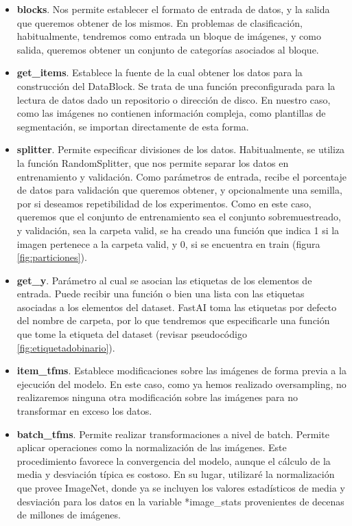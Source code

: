 \begin{itemize}
	\item \textbf{blocks}. Nos permite establecer el formato de entrada de datos, y la salida que queremos obtener de los mismos. En problemas de clasificación, habitualmente, tendremos como entrada un bloque de imágenes, y como salida, queremos obtener un conjunto de categorías asociados al bloque.
	\item \textbf{get\_items}. Establece la fuente de la cual obtener los datos para la construcción del DataBlock. Se trata de una función preconfigurada para la lectura de datos dado un repositorio o dirección de disco. En nuestro caso, como las imágenes no contienen información compleja, como plantillas de segmentación, se importan directamente de esta forma.
	\item \textbf{splitter}. Permite especificar divisiones de los datos. Habitualmente, se utiliza la función RandomSplitter, que nos permite separar los datos en entrenamiento y validación. Como parámetros de entrada, recibe el porcentaje de datos para validación que queremos obtener, y opcionalmente una semilla, por si deseamos repetibilidad de los experimentos. Como en este caso, queremos que el conjunto de entrenamiento sea el conjunto sobremuestreado, y validación, sea la carpeta valid, se ha creado una función que indica 1 si la imagen pertenece a la carpeta valid, y 0, si se encuentra en train (figura \ref{fig:particiones}).
	\item \textbf{get\_y}. Parámetro al cual se asocian las etiquetas de los elementos de entrada. Puede recibir una función o bien una lista con las etiquetas asociadas a los elementos del dataset. FastAI toma las etiquetas por defecto del nombre de carpeta, por lo que tendremos que especificarle una función que tome la etiqueta del dataset (revisar pseudocódigo \ref{fig:etiquetadobinario}).
	\item \textbf{item\_tfms}. Establece modificaciones sobre las imágenes de forma previa a la ejecución del modelo. En este caso, como ya hemos realizado oversampling, no realizaremos ninguna otra modificación sobre las imágenes para no transformar en exceso los datos.
	\item \textbf{batch\_tfms}. Permite realizar transformaciones a nivel de batch. Permite aplicar operaciones como la normalización de las imágenes. Este procedimiento favorece la convergencia del modelo, aunque el cálculo de la media y desviación típica es costoso. En su lugar, utilizaré la normalización que provee ImageNet, donde ya se incluyen los valores estadísticos de media y desviación para los datos en la variable *image\_stats provenientes de decenas de millones de imágenes.
	
\end{itemize}


